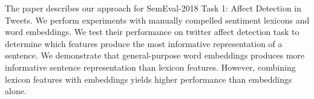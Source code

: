 The paper describes our approach for SemEval-2018 Task 1: Affect Detection in Tweets. We perform experiments with manually compelled sentiment lexicons and word embeddings. We test their performance on twitter affect detection task to determine which features produce the most informative representation of a sentence. We demonstrate that general-purpose word embeddings produces more informative sentence representation than lexicon features. However, combining lexicon features with embeddings yields higher performance than embeddings alone.
